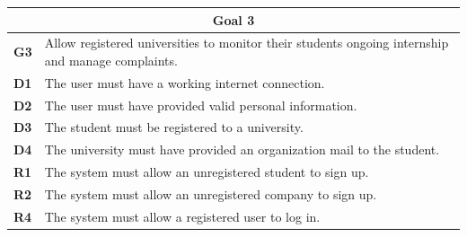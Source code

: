 \begin{table}[H]
    \centering
    \begin{tabular}{|l|m{10cm}|}
        \hline \multicolumn{2}{|c|}{\textbf{Goal 3}} \\
        \hline \textbf{G3} & Allow registered universities to monitor their students ongoing internship and manage complaints. \\
        \hline \textbf{D1} & The user must have a working internet connection. \\
        \hline \textbf{D2} & The user must have provided valid personal information. \\
        \hline \textbf{D3} & The student must be registered to a university. \\
        \hline \textbf{D4} & The university must have provided an organization mail to the student. \\
        \hline \textbf{R1} & The system must allow an unregistered student to sign up.\\
        \hline \textbf{R2} & The system must allow an unregistered company to sign up. \\
        \hline \textbf{R4} & The system must allow a registered user to log in. \\

\end{tabular}
\end{table}
